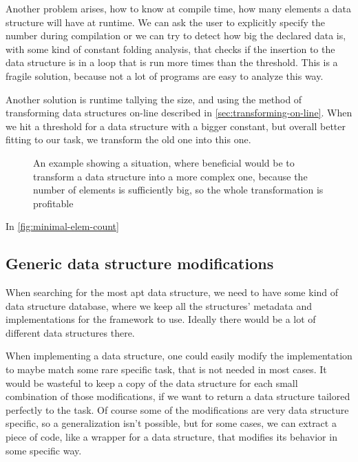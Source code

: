 \documentclass[a4paper,11pt]{article}
\begin{document}
		Another problem arises, how to know at compile time, how many elements a data structure will have at
		runtime. We can ask the user to explicitly specify the number during compilation or we can try to
		detect how big the declared data is, with some kind of constant folding analysis, that checks if the
		insertion to the data structure is in a loop that is run more times than the threshold. This is a fragile
		solution, because not a lot of programs are easy to analyze this way.

		Another solution is runtime tallying the size, and using the method of transforming data structures
		on-line described in \autoref{sec:transforming-on-line}. When we hit a threshold for a data structure
		with a bigger constant, but overall better fitting to our task, we transform the old one into this one.

		\begin{figure}
			

			\caption{An example showing a situation, where beneficial would be to transform a data structure
				into a more complex one, because the number of elements is sufficiently big, so the
				whole transformation is profitable}

			\label{fig:minimal-elem-count}
		\end{figure}

		In \autoref{fig:minimal-elem-count} 

	\subsection{Generic data structure modifications} \label{sub:gdsm}

		When searching for the most apt data structure, we need to have some kind of data structure database,
		where we keep all the structures' metadata and implementations for the framework to use. Ideally there
		would be a lot of different data structures there.

		When implementing a data structure, one could easily modify the implementation to maybe match some rare
		specific task, that is not needed in most cases. It would be wasteful to keep a copy of the data
		structure for each small combination of those modifications, if we want to return a data structure
		tailored perfectly to the task. Of course some of the modifications are very data structure specific, so
		a generalization isn't possible, but for some cases, we can extract a piece of code, like a wrapper for
		a data structure, that modifies its behavior in some specific way.
\end{document}
